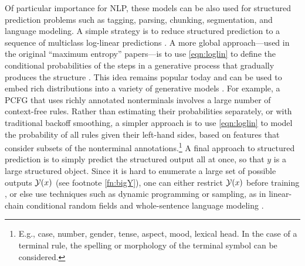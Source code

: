 \documentclass[11pt,letterpaper]{article}
\begin{document}
Of particular importance for NLP, these models can be also used for
structured prediction problems such as tagging, parsing, chunking,
segmentation, and language modeling.  A simple strategy is to reduce
structured prediction to a sequence of multiclass log-linear
predictions \cite{ratnaparkhi-1998}.  A more global approach---used in
the original ``maximum entropy'' papers---is to use \eqref{eqn:loglin}
to define the conditional probabilities of the steps in a generative
process that gradually produces the structure
\cite{rosenfeld-1994,berger-dellapietra-dellapietra-1996}.  This idea
remains popular today and can be used to embed rich distributions
into a variety of generative models \cite{bergkirkpatrick-et-al-2010}.
For example, a PCFG that uses richly annotated nonterminals involves a
large number of context-free rules.  Rather than estimating their
probabilities separately, or with traditional backoff smoothing, a
simpler approach is to use \eqref{eqn:loglin} to model the probability
of all rules given their left-hand sides, based on features that
consider subsets of the nonterminal annotations.\footnote{E.g., case,
  number, gender, tense, aspect, mood, lexical head.  In the case of a
  terminal rule, the spelling or morphology of the terminal symbol can
  be considered.}  A final approach to structured prediction is to
simply predict the structured output all at once, so that $y$ is a
large structured object.  Since it is hard to enumerate
a large set of possible outputs ${\cal Y}(x)$ (see footnote
\ref{fn:bigY}), one can either restrict ${\cal Y}(x)$ before training
\cite{johnson-et-al-1999}, or else use techniques such as dynamic
programming or sampling, as in linear-chain conditional random fields
\cite{lafferty-mccallum-pereira-2001} and whole-sentence language
modeling \cite{rosenfeld-chen-zhu-2001}.



\end{document}
